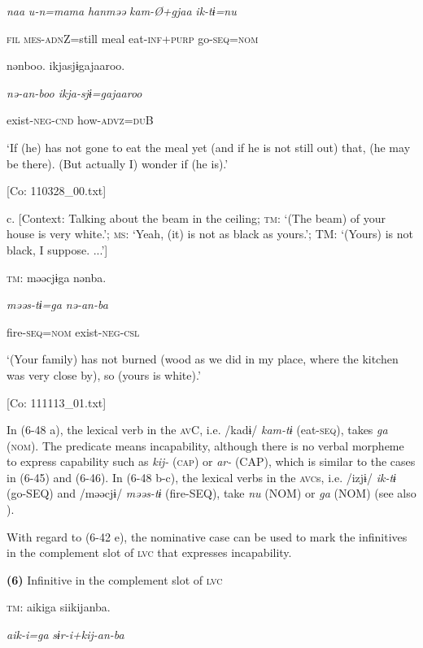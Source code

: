       \textit{naa}  \textit{u-n=mama}  \textit{hanməə}  \textit{kam-Ø+gjaa}  \textit{ik-tɨ=nu}

      \textsc{fil}  \textsc{mes}-\textsc{adn}Z=still  meal  eat-\textsc{inf}+\textsc{purp}  go-\textsc{seq}=\textsc{nom}

      nənboo.  ikjasjɨgajaaroo.

      \textit{nə-an{}-boo  ikja-sjɨ=gajaaroo}

      exist-\textsc{neg}-\textsc{cnd}  how-\textsc{advz}=\textsc{du}B

      ‘If (he) has not gone to eat the meal yet (and if he is not still out) that, (he may be there). (But actually I) wonder if (he is).’

      [Co: 110328\_00.txt]

  c.  [Context: Talking about the beam in the ceiling; \textsc{tm}: ‘(The beam) of your house is very white.’; \textsc{ms}: ‘Yeah, (it) is not as black as yours.’; TM: ‘(Yours) is not black, I suppose. ...’]

    \textsc{tm}:  məəcjɨga  nənba.

      \textit{məəs-tɨ=ga}  \textit{nə-an{}-ba}

      fire-\textsc{seq}=\textsc{nom}  exist-\textsc{neg}-\textsc{csl}

      ‘(Your family) has not burned (wood as we did in my place, where the kitchen was very close by), so (yours is white).’

      [Co: 111113\_01.txt]

In (6-48 a), the lexical verb in the \textsc{av}C, i.e. /kadɨ/ \textit{kam-tɨ} (eat-\textsc{seq}), takes \textit{ga} (\textsc{nom}). The predicate means incapability, although there is no verbal morpheme to express capability such as \textit{kij-} (\textsc{cap}) or \textit{ar-} (CAP), which is similar to the cases in (6-45) and (6-46). In (6-48 b-c), the lexical verbs in the \textsc{avc}s, i.e. /izjɨ/ \textit{ik-tɨ} (go-SEQ) and /məəcjɨ/ \textit{məəs-tɨ} (fire-SEQ), take \textit{nu} (NOM) or \textit{ga} (NOM) (see also ).

With regard to (6-42 e), the nominative case can be used to mark the infinitives in the complement slot of \textsc{lvc} that expresses incapability.

\textbf{(6)}  Infinitive in the complement slot of \textsc{lvc}

  \textsc{tm}:  aikiga  siikijanba.

    \textit{aik-i=ga}  \textit{sɨr-i+kij-an-ba}

